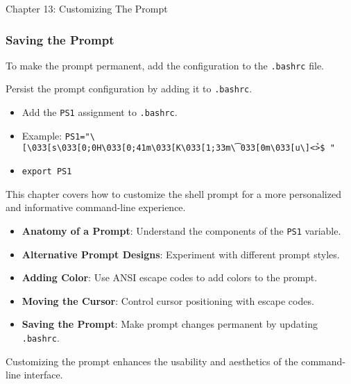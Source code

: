 \begin{notes}{Chapter 13: Customizing The Prompt}
\begin{highlight}
    \end{highlight}
    
    \subsubsection*{Saving the Prompt}
    
    To make the prompt permanent, add the configuration to the \texttt{.bashrc} file.
    
    \begin{highlight}
    
    Persist the prompt configuration by adding it to \texttt{.bashrc}.
    
    \begin{itemize}
        \item Add the \texttt{PS1} assignment to \texttt{.bashrc}.
        \item Example: \texttt{PS1="\textbackslash{}[\textbackslash{}033[s\textbackslash{}033[0;0H\textbackslash{}033[0;41m\textbackslash{}033[K\textbackslash{}033[1;33m\t\textbackslash{}033[0m\textbackslash{}033[u\textbackslash{}]<\u@\h \W>\$ "}
        \item \texttt{export PS1}
    \end{itemize}
    
    \end{highlight}
    
    \begin{highlight}
    
    This chapter covers how to customize the shell prompt for a more personalized and informative command-line experience.
    
    \begin{itemize}
        \item \textbf{Anatomy of a Prompt}: Understand the components of the \texttt{PS1} variable.
        \item \textbf{Alternative Prompt Designs}: Experiment with different prompt styles.
        \item \textbf{Adding Color}: Use ANSI escape codes to add colors to the prompt.
        \item \textbf{Moving the Cursor}: Control cursor positioning with escape codes.
        \item \textbf{Saving the Prompt}: Make prompt changes permanent by updating \texttt{.bashrc}.
    \end{itemize}
    
    Customizing the prompt enhances the usability and aesthetics of the command-line interface.
    
    \end{highlight}
\end{notes}

